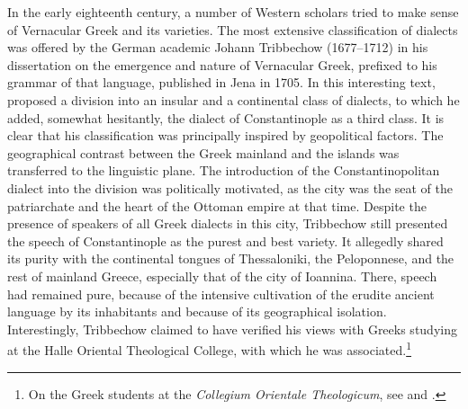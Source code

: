 In the early eighteenth century, a number of Western scholars tried to make sense of Vernacular Greek and its varieties. The most extensive classification of  dialects was offered by the German academic Johann Tribbechow (1677–1712) in his dissertation on the emergence and nature of Vernacular Greek, prefixed to his grammar of that language, published in Jena in 1705. In this interesting text, \citet[a.4\textsc{\textsuperscript{r}}\textsc{–}a.4\textsc{\textsuperscript{v}}]{Tribbechow1705} proposed a division into an insular and a continental class of dialects, to which he added, somewhat hesitantly, the dialect of Constantinople as a third class. It is clear that his classification was principally inspired by geopolitical factors. The geographical contrast between the Greek mainland and the islands was transferred to the linguistic plane. The introduction of the Constantinopolitan dialect into the division was politically motivated, as the city was the seat of the patriarchate and the heart of the Ottoman empire at that time. Despite the presence of speakers of all  Greek dialects in this city, Tribbechow still presented the speech of Constantinople as the purest and best variety. It allegedly shared its purity with the continental tongues of Thessaloniki, the Peloponnese, and the rest of mainland Greece, especially that of the city of Ioannina. There,  speech had remained pure, because of the intensive cultivation of the erudite ancient language by its inhabitants and because of its geographical isolation. Interestingly, Tribbechow claimed to have verified his views with Greeks studying at the Halle Oriental Theological College, with which he was associated.\footnote{On the Greek students at the \textit{Collegium Orientale Theologicum}, see \citet{Moennig1998} and \citet[283]{Makrides2006}.}

